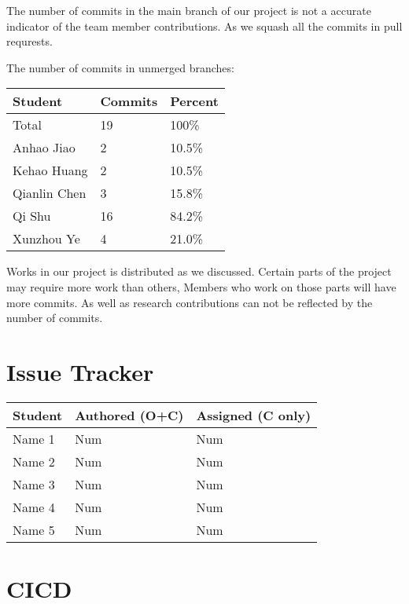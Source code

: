 \documentclass{article}
\begin{document}
The number of commits in the main branch of our project is not a accurate indicator of the team member contributions. As we squash all the commits in pull requrests.

The number of commits in unmerged branches:
\begin{table}[H]
    \centering
    \begin{tabular}{lll}
    \toprule
    \textbf{Student} & \textbf{Commits} & \textbf{Percent}\\
    \midrule
    Total & 19 & 100\% \\
    Anhao Jiao & 2 & 10.5\% \\
    Kehao Huang & 2 & 10.5\% \\
    Qianlin Chen & 3 & 15.8\% \\
    Qi Shu & 16 & 84.2\% \\
    Xunzhou Ye & 4 & 21.0\% \\
    \bottomrule
    \end{tabular}
    \end{table}

Works in our project is distributed as we discussed. Certain parts of the project may require more work than others, 
Members who work on those parts will have more commits. As well as research contributions can not be reflected by the number of commits.

\section{Issue Tracker}


\begin{table}[H]
\centering
\begin{tabular}{lll}
\toprule
\textbf{Student} & \textbf{Authored (O+C)} & \textbf{Assigned (C only)}\\
\midrule
Name 1 & Num & Num \\
Name 2 & Num & Num \\
Name 3 & Num & Num \\
Name 4 & Num & Num \\
Name 5 & Num & Num \\
\bottomrule
\end{tabular}
\end{table}


\section{CICD}

\end{document}
